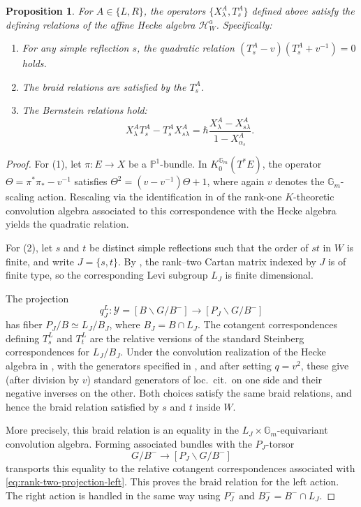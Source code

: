 \documentclass{amsart}
\newcommand{\Hecke}{\mathcal{H}}
\newtheorem{Prop}[Thm]{Proposition}
\theoremstyle{definition}
\numberwithin{equation}{section}
\begin{document}
\begin{Prop}
For $A \in \{L, R\}$, the operators $\{X_\lambda^A, T_s^A\}$ defined above satisfy the defining relations of the affine Hecke algebra $\Hecke_W^a$. Specifically:
\begin{enumerate}
    \item For any simple reflection $s$, the quadratic relation $(T_s^A - v)(T_s^A + v^{-1}) = 0$ holds.
    \item The braid relations are satisfied by the $T_s^A$.
    \item The Bernstein relations hold:
    \[
    X_\lambda^A T_s^A - T_s^A X_{s\lambda}^A = \hbar \frac{X_\lambda^A - X_{s\lambda}^A}{1 - X_{\alpha_s}^A}.
    \]
\end{enumerate}
\end{Prop}
\begin{proof}
For (1), let $\pi: E \to X$ be a $\mathbb{P}^1$-bundle. In $K_0^{\mathbb{G}_m}(T^*E)$, the operator $\Theta = \pi^* \pi_* - v^{-1}$ satisfies $\Theta^2 = (v - v^{-1})\Theta + 1$, where again $v$ denotes the $\mathbb{G}_m$-scaling action. Rescaling via the identification in \cite[Theorem 7.2.5]{CG} of the rank-one $K$-theoretic convolution algebra associated to this correspondence with the Hecke algebra yields the quadratic relation.

For (2), let $s$ and $t$ be distinct simple reflections such that the order of $st$ in $W$ is finite, and write
$J=\{s,t\}$. By \cite[Proposition~3.13]{Kac_infdim}, the rank--two
Cartan matrix indexed by $J$ is of finite type, so the corresponding
Levi subgroup $L_J$ is finite dimensional.

The projection
\begin{equation}\label{eq:rank-two-projection-left}
q_J^L:\mathcal Y=[B\backslash G/B^-]\longrightarrow
[P_J\backslash G/B^-]
\end{equation}
has fiber
$P_J/B\simeq L_J/B_J$, where $B_J=B\cap L_J$. The cotangent
correspondences defining $T_s^L$ and $T_t^L$ are the relative versions
of the standard Steinberg correspondences for $L_J/B_J$. Under the
convolution realization of the Hecke algebra in
\cite[Theorem~7.6.10]{CG}, with the generators specified in \cite[(7.6.1)]{CG},
and after setting $q=v^2$, these give (after division by $v$)
standard generators of loc.\ cit.\ on one side and their negative inverses on the
other. Both choices satisfy the same braid relations, and hence the
braid relation satisfied by $s$ and $t$ inside $W$.

More precisely, this braid relation is an equality in the
$L_J\times\mathbb G_m$-equivariant convolution algebra. Forming
associated bundles with the $P_J$-torsor
\[
G/B^-\longrightarrow[P_J\backslash G/B^-]
\]
transports this equality to the
relative cotangent correspondences associated with
\eqref{eq:rank-two-projection-left}. This proves the braid
relation for the left action. The right action is handled in the same
way using $P_J^-$ and $B_J^-=B^-\cap L_J$.


\end{proof}
\end{document}
